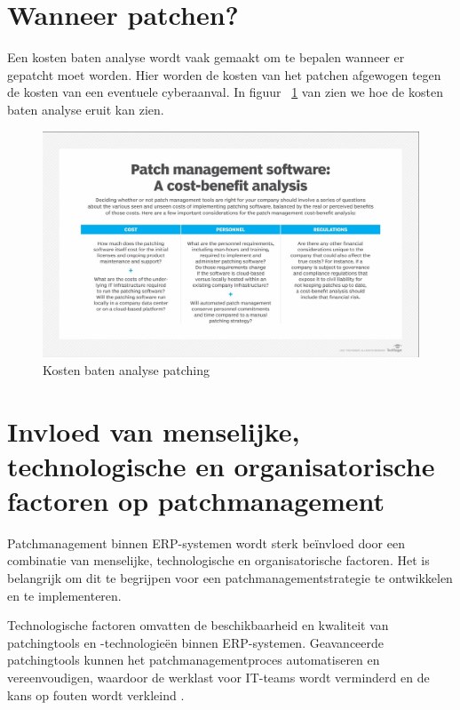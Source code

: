 \section{Wanneer patchen?}
Een kosten baten analyse wordt vaak gemaakt om te bepalen wanneer er gepatcht moet worden. Hier worden de kosten van het patchen afgewogen tegen de kosten van een eventuele cyberaanval.
In figuur ~\ref{fig:kostenbaten} van \textcite{Posey2024} zien we hoe de kosten baten analyse eruit kan zien.

\begin{figure}[h]
    \centering
    \includegraphics[width=\textwidth]{techtarget.jpg}
    \caption{Kosten baten analyse patching \autocite{Posey2024}}
    \label{fig:kostenbaten}
\end{figure}

\newpage

\section{Invloed van menselijke, technologische en organisatorische factoren op patchmanagement}




Patchmanagement binnen ERP-systemen wordt sterk beïnvloed door een combinatie van menselijke, technologische en organisatorische factoren. Het is belangrijk om dit te begrijpen voor een patchmanagementstrategie te ontwikkelen en te implementeren.


Technologische factoren omvatten de beschikbaarheid en kwaliteit van patchingtools en -technologieën binnen ERP-systemen. Geavanceerde
patchingtools kunnen het patchmanagementproces automatiseren en vereenvoudigen, waardoor de werklast voor IT-teams wordt verminderd en de kans op fouten wordt verkleind \autocite{Graffeo2018}.

